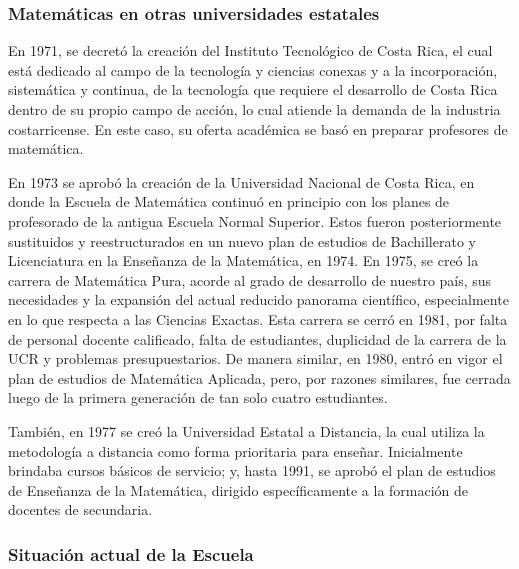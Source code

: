 \subsubsection*{Matemáticas en otras universidades estatales}

En 1971, se decretó la creación del Instituto Tecnológico de Costa Rica, el cual está dedicado al campo de la tecnología y ciencias conexas y a la incorporación, sistemática y continua, de la tecnología que requiere el desarrollo de Costa Rica dentro de su propio campo de acción, lo cual atiende la demanda de la industria costarricense. En este caso, su oferta académica se basó en preparar profesores de matemática.

En 1973 se aprobó la creación de la Universidad Nacional de Costa Rica, en donde la Escuela de Matemática continuó en principio con los planes de profesorado de la antigua Escuela Normal Superior. Estos fueron posteriormente sustituidos y reestructurados en un nuevo plan de estudios de Bachillerato y Licenciatura en la Enseñanza de la Matemática, en 1974. En 1975, se creó la carrera de Matemática Pura, acorde al grado de desarrollo de nuestro país, sus necesidades y la expansión del actual reducido panorama científico, especialmente en lo que respecta a las Ciencias Exactas. Esta carrera se cerró en 1981, por falta de personal docente calificado, falta de estudiantes, duplicidad de la carrera de la UCR y problemas presupuestarios. De manera similar, en 1980, entró en vigor el plan de estudios de Matemática Aplicada, pero, por razones similares, fue cerrada luego de la primera generación de tan solo cuatro estudiantes. 

También, en 1977 se creó la Universidad Estatal a Distancia, la cual utiliza la metodología a distancia como forma prioritaria para enseñar. Inicialmente brindaba cursos básicos de servicio; y,
hasta 1991, se aprobó el plan de estudios de Enseñanza de la Matemática, dirigido específicamente a la formación de docentes de secundaria. 

\subsubsection*{Situación actual de la Escuela }


